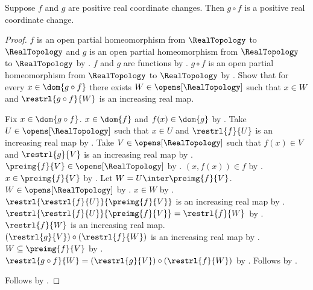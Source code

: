 \begin{theorem}\label{positive_real_change_composition}
    Suppose $f$ and $g$ are positive real coordinate changes.
    Then $g\circ f$ is a positive real coordinate change.
\end{theorem}
\begin{proof}
    $f$ is an open partial homeomorphism from $\RealTopology$ to $\RealTopology$ and
        $g$ is an open partial homeomorphism from $\RealTopology$ to $\RealTopology$ by
        .
    $f$ and $g$ are functions by
        .
    $g\circ f$ is an open partial homeomorphism from $\RealTopology$ to $\RealTopology$
        by .
    Show that for every $x\in\dom{g\circ f}$ there exists $W\in\opens[\RealTopology]$
        such that $x\in W$ and $\restrl{g\circ f}{W}$ is an increasing real map.
    \begin{subproof}
        Fix $x\in\dom{g\circ f}$.
        $x\in\dom{f}$ and $f(x)\in\dom{g}$ by .
        Take $U\in\opens[\RealTopology]$ such that $x\in U$ and
            $\restrl{f}{U}$ is an increasing real map by .
        Take $V\in\opens[\RealTopology]$ such that $f(x)\in V$ and
            $\restrl{g}{V}$ is an increasing real map by .
        $\preimg{f}{V}\in\opens[\RealTopology]$ by
            .
        $(x,f(x))\in f$ by .
        $x\in\preimg{f}{V}$ by .
        Let $W=U\inter\preimg{f}{V}$.
        $W\in\opens[\RealTopology]$ by .
        $x\in W$ by .
        $\restrl{\restrl{f}{U}}{\preimg{f}{V}}$ is an increasing real map by
            .
        $\restrl{\restrl{f}{U}}{\preimg{f}{V}}=\restrl{f}{W}$ by
            .
        $\restrl{f}{W}$ is an increasing real map.
        $(\restrl{g}{V})\circ(\restrl{f}{W})$ is an increasing real map by
            .
        $W\subseteq\preimg{f}{V}$ by .
        $\restrl{g\circ f}{W}=(\restrl{g}{V})\circ(\restrl{f}{W})$ by
            .
        Follows by \auto.
    \end{subproof}
    Follows by .
\end{proof}
